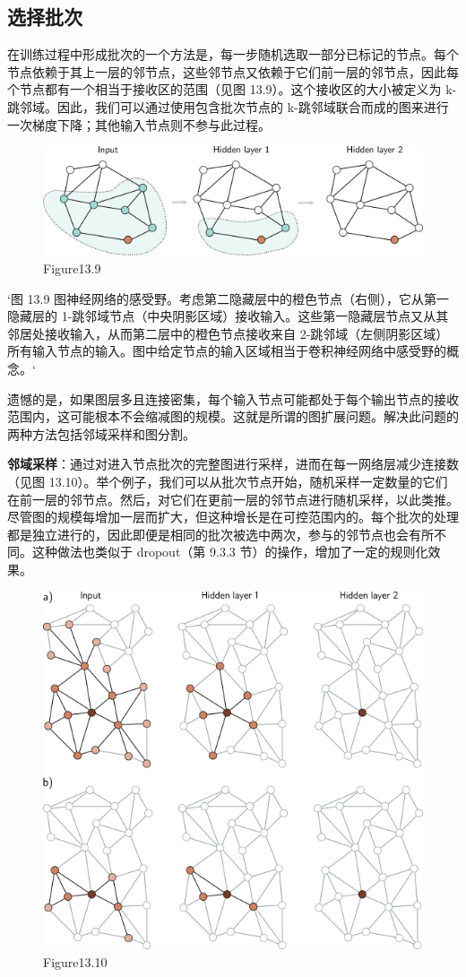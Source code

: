\subsection{选择批次}
在训练过程中形成批次的一个方法是，每一步随机选取一部分已标记的节点。每个节点依赖于其上一层的邻节点，这些邻节点又依赖于它们前一层的邻节点，因此每个节点都有一个相当于接收区的范围（见图 13.9）。这个接收区的大小被定义为 k-跳邻域。因此，我们可以通过使用包含批次节点的 k-跳邻域联合而成的图来进行一次梯度下降；其他输入节点则不参与此过程。

\begin{figure}[ht!]
\centering
\includegraphics[width=0.7\linewidth]{png/chapter13/GraphReceptiveField.png}
\caption{Figure13.9}
\end{figure}

`图 13.9 图神经网络的感受野。考虑第二隐藏层中的橙色节点（右侧），它从第一隐藏层的 1-跳邻域节点（中央阴影区域）接收输入。这些第一隐藏层节点又从其邻居处接收输入，从而第二层中的橙色节点接收来自 2-跳邻域（左侧阴影区域）所有输入节点的输入。图中给定节点的输入区域相当于卷积神经网络中感受野的概念。`

遗憾的是，如果图层多且连接密集，每个输入节点可能都处于每个输出节点的接收范围内，这可能根本不会缩减图的规模。这就是所谓的图扩展问题。解决此问题的两种方法包括邻域采样和图分割。

\textbf{邻域采样}：通过对进入节点批次的完整图进行采样，进而在每一网络层减少连接数（见图 13.10）。举个例子，我们可以从批次节点开始，随机采样一定数量的它们在前一层的邻节点。然后，对它们在更前一层的邻节点进行随机采样，以此类推。尽管图的规模每增加一层而扩大，但这种增长是在可控范围内的。每个批次的处理都是独立进行的，因此即便是相同的批次被选中两次，参与的邻节点也会有所不同。这种做法也类似于 dropout（第 9.3.3 节）的操作，增加了一定的规则化效果。

\begin{figure}[ht!]
\centering
\includegraphics[width=0.7\linewidth]{png/chapter13/GraphSampling.png}
\caption{Figure13.10}
\end{figure}

